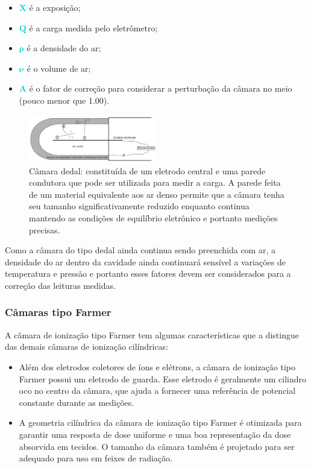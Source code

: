 \documentclass[11pt,a4paper]{article}
\newcounter{exemplo}
\begin{document}
		\begin{exemplo}[Onde]
			\begin{itemize}[label=\textcolor{CarnationPink}{$\star$}]
				\item \textcolor{DarkTurquoise}{$\mathbf{X}$} é a exposição;
				\item \textcolor{DarkTurquoise}{$\mathbf{Q}$} é a carga medida pelo eletrômetro;
				\item \textcolor{DarkTurquoise}{$\mathbf{\rho}$} é a densidade do ar;
				\item \textcolor{DarkTurquoise}{$\mathbf{\nu}$} é o volume de ar;
				\item \textcolor{DarkTurquoise}{$\mathbf{A}$} é o fator de correção para considerar a perturbação da câmara no meio (pouco menor que 1.00).
			\end{itemize}
		\end{exemplo}

		\begin{figure}[h]
			\centering
			\includegraphics[width=0.5\textwidth]{Imagens/camaraDedal.jpg}
			\caption{Câmara dedal: constituída de um eletrodo central e uma parede condutora que pode ser utilizada para medir a carga. A parede feita de um material equivalente aos ar denso permite que a câmara tenha seu tamanho significativamente reduzido enquanto continua mantendo as condições de equilíbrio eletrônico e portanto medições precisas.}
			\label{fig:camaraDedal}
		\end{figure}

		Como a câmara do tipo dedal ainda continua sendo preenchida com ar, a densidade do ar dentro da cavidade ainda continuará sensível a variações de temperatura e pressão e portanto esses fatores devem ser considerados para a correção das leituras medidas.

\subsubsection*{Câmaras tipo Farmer}

	A câmara de ionização tipo Farmer tem algumas características que a distingue das demais câmaras de ionização cilíndricas:

	\begin{itemize}[label=\textcolor{CarnationPink}{$\blacktriangleright$}]
		\item Além dos eletrodos coletores de íons e elétrons, a câmara de ionização tipo Farmer possui um eletrodo de guarda. Esse eletrodo é geralmente um cilindro oco no centro da câmara, que ajuda a fornecer uma referência de potencial constante durante as medições.
		\item A geometria cilíndrica da câmara de ionização tipo Farmer é otimizada para garantir uma resposta de dose uniforme e uma boa representação da dose absorvida em tecidos. O tamanho da câmara também é projetado para ser adequado para uso em feixes de radiação.
	\end{itemize}
\end{document}

